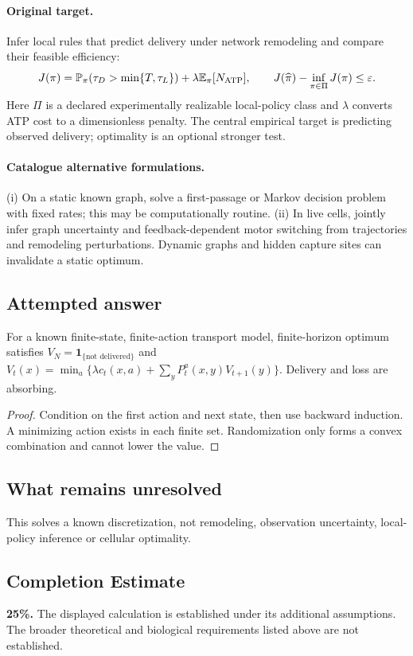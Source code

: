 \documentclass[11pt]{article}
\begin{document}
\paragraph{Original target.}
Infer local rules that predict delivery under network remodeling and compare their feasible efficiency:
\[
J(\pi)=\mathbb{P}_\pi(\tau_D>\min\{T,\tau_L\})+
\lambda\mathbb{E}_\pi[N_{\rm ATP}],\qquad
J(\widehat\pi)-\inf_{\pi\in\Pi}J(\pi)\leq\varepsilon.
\]
Here $\Pi$ is a declared experimentally realizable local-policy class and $\lambda$ converts ATP cost to a dimensionless penalty. The central empirical target is predicting observed delivery; optimality is an optional stronger test.
\paragraph{Catalogue alternative formulations.}
(i) On a static known graph, solve a first-passage or Markov decision problem with fixed rates; this may be computationally routine. (ii) In live cells, jointly infer graph uncertainty and feedback-dependent motor switching from trajectories and remodeling perturbations. Dynamic graphs and hidden capture sites can invalidate a static optimum.
\subsection{Attempted answer}
\begin{proposition}
For a known finite-state, finite-action transport model, finite-horizon optimum satisfies $V_N=\mathbf1_{\{\text{not delivered}\}}$ and $V_t(x)=\min_a\{\lambda c_t(x,a)+\sum_yP_t^a(x,y)V_{t+1}(y)\}$. Delivery and loss are absorbing.
\end{proposition}
\begin{proof}
Condition on the first action and next state, then use backward induction. A minimizing action exists in each finite set. Randomization only forms a convex combination and cannot lower the value.
\end{proof}
\subsection{What remains unresolved}
This solves a known discretization, not remodeling, observation uncertainty, local-policy inference or cellular optimality.
\subsection{Completion Estimate}
\textbf{25\%.} The displayed calculation is established under its additional assumptions. The broader theoretical and biological requirements listed above are not established.
\end{document}
